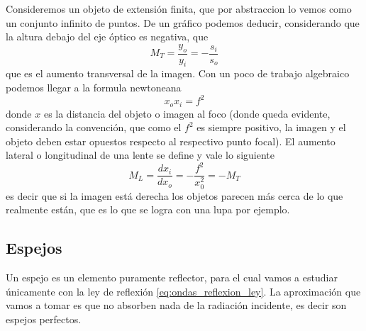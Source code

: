\documentclass[a4paper]{article}
\numberwithin{equation}{section}
\begin{document}
		Consideremos un objeto de extensión finita, que por abstraccion lo vemos como un conjunto infinito de puntos. De un gráfico podemos deducir, considerando que la altura debajo del eje óptico es negativa, que
		\begin{equation}
			M_T = \frac{y_o}{y_i} = -\frac{s_i}{s_o}
			\label{eq:lentes_aumento_transversal}
		\end{equation}
		que es el aumento transversal de la imagen. Con un poco de trabajo algebraico podemos llegar a la formula newtoneana
		\begin{equation}
			x_o x_i = f^2
			\label{eq:lentes_newton}
		\end{equation}
		donde $x$ es la distancia del objeto o imagen al foco (donde queda evidente, considerando la convención, que como el $f^2$ es siempre positivo, la imagen y el objeto deben estar opuestos respecto al respectivo punto focal). El aumento lateral o longitudinal de una lente se define y vale lo siguiente
		\begin{equation}
			M_L = \frac{d x_i}{d x_o} = - \frac{f^2}{x_0^2} = - M_T
			\label{eq:lentes_aumento_lateral}
		\end{equation}
		es decir que si la imagen está derecha los objetos parecen más cerca de lo que realmente están, que es lo que se logra con una lupa por ejemplo.
		
		\subsection{Espejos}
		Un espejo es un elemento puramente reflector, para el cual vamos a estudiar únicamente con la ley de reflexión \ref{eq:ondas_reflexion_ley}. La aproximación que vamos a tomar es que no absorben nada de la radiación incidente, es decir son espejos perfectos. 
		
\end{document}
